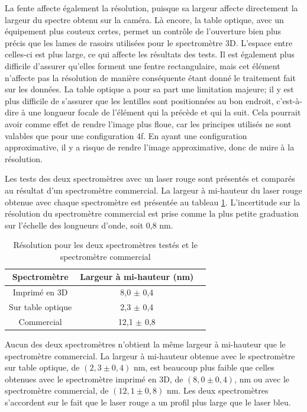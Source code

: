 \documentclass[11pt,letterpaper]{article}
\begin{document}
La fente affecte également la résolution, puisque sa largeur affecte directement la largeur du spectre
obtenu sur la caméra. Là encore, la table optique, avec un équipement plus couteux certes, permet un
contrôle de l'ouverture bien plus précis que les lames de rasoirs utilisées pour le spectromètre 3D.
L'espace entre celles-ci est plus large, ce qui affecte les résultats des tests. Il est également 
plus difficile d'assurer qu'elles forment une fentre rectangulaire, mais cet élément n'affecte pas 
la résolution de manière conséquente étant donné le traitement fait sur les données.
La table optique a pour sa part une limitation majeure; il y est plus difficile de s'assurer que les
lentilles sont positionnées au bon endroit, c'est-à-dire à une longueur focale de l'élément qui la 
précède et qui la suit. Cela pourrait avoir comme effet de rendre l'image plus floue, car les principes
utilisés ne sont valables que pour une configuration 4f. En ayant une configuration approximative,
il y a risque de rendre l'image approximative, donc de nuire à la résolution. 

Les tests des deux spectromètres avec un laser rouge sont présentés et comparés au résultat d'un 
spectromètre commercial. La largeur à mi-hauteur du laser rouge obtenue avec chaque spectromètre est 
présentée au tableau \ref{res_tab_rouge}. L'incertitude sur la résolution du spectromètre commercial 
est prise comme la plus petite graduation sur l'échelle des longueurs d'onde, soit 0,8 nm.

\begin{table}[H]
  \centering
  \begin{tabular}{|c|c|c|}\hline
    Spectromètre & Largeur à mi-hauteur (nm) \\
    \hline
    Imprimé en 3D & 8,0 $\pm$ 0,4\\    \hline
    Sur table optique & 2,3 $\pm$ 0,4\\    \hline
    Commercial & 12,1 $\pm$ 0,8\\    \hline
  \end{tabular}
  \caption{Résolution pour les deux spectromètres testés et le spectromètre commercial}
  \label{res_tab_rouge}
\end{table}

Aucun des deux spectromètres n'obtient la même largeur à mi-hauteur que le spectromètre commercial.
La largeur à mi-hauteur obtenue avec le spectromètre sur table optique, de $(2,3 \pm 0,4)$ nm, est 
beaucoup plus faible que celles obtenues avec le spectromètre imprimé en 3D, de $(8,0 \pm 0,4)$, nm 
ou avec le spectromètre commercial, de $(12,1 \pm 0,8)$ nm. Les deux spectromètres s'accordent sur 
le fait que le laser rouge a un profil plus large que le laser bleu.
\end{document}
